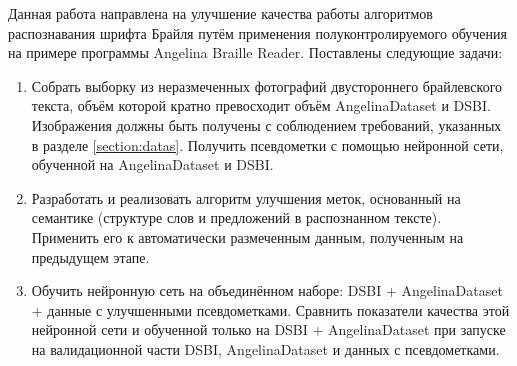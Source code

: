 \documentclass{main.tex}[subfiles]
\begin{document}
Данная работа направлена на улучшение качества работы алгоритмов распознавания шрифта Брайля путём применения полуконтролируемого обучения на примере программы Angelina Braille Reader. %
Поставлены следующие задачи:
\begin{enumerate}
	\item Собрать выборку из неразмеченных фотографий двустороннего брайлевского текста, объём которой кратно превосходит объём An\-ge\-li\-na\-Da\-ta\-set и DSBI. Изображения должны быть получены с соблюдением требований, указанных в разделе \ref{section:datas}.
	Получить псевдометки с помощью нейронной сети, обученной на An\-ge\-li\-na\-Da\-ta\-set  и DSBI.
	\item  Разработать и реализовать алгоритм улучшения меток, основанный на семантике (структуре слов и предложений в распознанном тексте).
	Применить его к автоматически размеченным данным, полученным на предыдущем этапе.
	\item Обучить нейронную сеть на объединённом наборе: DSBI + An\-ge\-li\-na\-Da\-ta\-set + данные с улучшенными псевдометками.
	Сравнить показатели качества этой нейронной сети и обученной только на DSBI + An\-ge\-li\-na\-Da\-ta\-set при запуске на валидационной части DSBI, An\-ge\-li\-na\-Da\-ta\-set и данных с псевдометками.
\end{enumerate}
\end{document}
